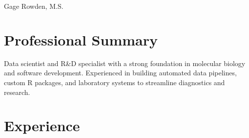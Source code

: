 \documentclass{resume}
\begin{document}
    \begin{header}

        \fontsize{25 pt}{25 pt}\selectfont Gage Rowden, M.S.\\
        \vspace{5 pt}
        \normalsize
        \mbox{}
        \AND
        \mbox{}
        \AND
        \mbox{}
        \AND
        \mbox{}
        \AND
        \mbox{}

    \end{header}

    \vspace{5 pt - 0.3 cm}

    \section{Professional Summary}
        \begin{centering}
        \Large{Data scientist and R\&D specialist with a strong foundation in molecular biology and software development. Experienced in building automated data pipelines, custom R packages, and laboratory systems to streamline diagnostics and research.}
        
        \end{centering}

    \section{Experience}
\end{document}
